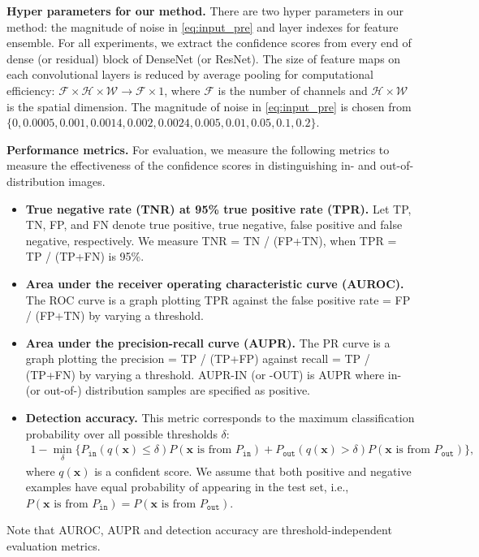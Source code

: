 \documentclass{article}
\begin{document}
{\bf Hyper parameters for our method.} 
There are two hyper parameters in our method: the magnitude of noise in \eqref{eq:input_pre} and layer indexes for feature ensemble.
For all experiments, we extract the confidence scores from every end of dense (or residual) block of DenseNet (or ResNet).
The size of feature maps on each convolutional layers is reduced by average pooling for computational efficiency: $\mathcal{F} \times \mathcal{H} \times \mathcal{W} \rightarrow \mathcal{F} \times 1$, where $\mathcal{F}$ is the number of channels and $\mathcal{H} \times \mathcal{W}$ is the spatial dimension.
The magnitude of noise in \eqref{eq:input_pre} is chosen from $\{0, 0.0005, 0.001, 0.0014, 0.002, 0.0024, 0.005, 0.01, 0.05, 0.1, 0.2 \}$. 

{\bf Performance metrics.} For evaluation, we measure the following metrics to measure the effectiveness of the confidence scores in distinguishing in- and out-of-distribution images.
\begin{itemize}
\item {\bf True negative rate (TNR) at 95\% true positive rate (TPR).} Let TP, TN, FP, and FN denote true positive, true negative, false positive and false negative, respectively. We measure TNR = TN / (FP+TN), when TPR = TP / (TP+FN) is 95\%. 
\item {\bf Area under the receiver operating characteristic curve (AUROC).} The ROC curve is a graph plotting TPR against the false positive rate = FP / (FP+TN) by varying a threshold. 
\item {\bf Area under the precision-recall curve (AUPR).} The PR curve is a graph plotting the precision = TP / (TP+FP) against recall = TP / (TP+FN) by varying a threshold. AUPR-IN (or -OUT) is AUPR where in- (or out-of-) distribution samples are specified as positive.
\item {\bf Detection accuracy.} This metric corresponds to the maximum classification probability over all possible thresholds $\delta$:
\begin{align*}
 1- \min_{\delta} \big\{ P_{\texttt{in}} \left( q \left( \mathbf{x} \right) \leq \delta \right) P \left(\mathbf{x}\text{ is from }P_{\texttt{in}}\right)+ P_{\texttt{out}} \left( q \left( \mathbf{x} \right) >\delta \right) P \left(\mathbf{x}\text{ is from }P_{\texttt{out}}\right)\big\},
\end{align*}
where $q(\mathbf{x})$ is a confident score. 
We assume that both positive and negative examples have equal probability of appearing in the test set, i.e., $P \left(\mathbf{x}\text{ is from }P_{\texttt{in}}\right) = P \left(\mathbf{x}\text{ is from }P_{\texttt{out}}\right)$. 
\end{itemize}
Note that AUROC, AUPR and detection accuracy are threshold-independent evaluation metrics.
\end{document}
